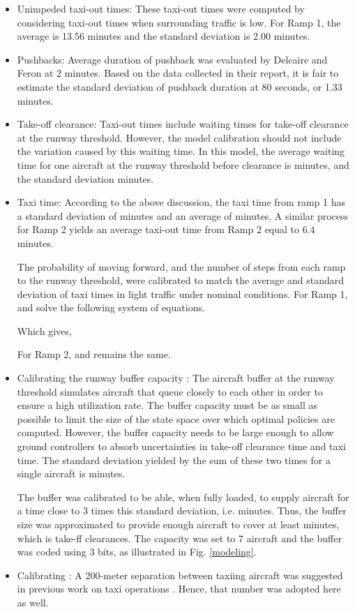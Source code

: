 \documentclass[letterpaper]{article}
\begin{document}
\fi
\begin{itemize}
\item Unimpeded taxi-out times: These taxi-out times were computed by considering taxi-out times when surrounding traffic is low. For Ramp 1, the average is 13.56 minutes and the standard deviation is 2.00 minutes.

\item Pushbacks:
Average duration of pushback was evaluated by Delcaire and Feron \cite{Delcaire1997} at 2 minutes. Based on the data collected in their report, it is fair to estimate the standard deviation of pushback duration at 80 seconds, or 1.33 minutes.

\item Take-off clearance:
Taxi-out times include waiting times for take-off clearance at the runway threshold. However, the 
model calibration should not include the variation caused by this waiting time. In this model, the average waiting time for one aircraft at the runway threshold before clearance is  minutes, and the standard deviation  minutes.

\item Taxi time:
According to the above discussion, the taxi time from ramp 1 has a standard deviation of  minutes 
and an average of  minutes. A similar process for Ramp 2 yields an average taxi-out time from Ramp 2 equal to 6.4 minutes.

The probability   of moving forward, and the number of steps  from each ramp to the runway threshold, were calibrated to match the average and standard deviation of taxi times in light traffic under nominal conditions. For Ramp 1,  and  solve the following system of equations.


 

Which gives,

 
For Ramp 2,  and  remains the same.
\item Calibrating the runway buffer capacity :
The aircraft buffer  at the runway threshold simulates aircraft that queue closely to each other in order to ensure a high utilization rate. 
The buffer capacity must be as small as possible to limit the size of the state space over which optimal policies are computed.
However, the buffer capacity needs to be large enough to allow ground controllers to absorb uncertainties in take-off clearance time and taxi time. 
The standard deviation yielded by the sum of these two times for a single aircraft is  minutes.

The buffer was calibrated to be able, when fully loaded, to supply aircraft for a time close to 3 times this standard deviation, i.e.  minutes. 
Thus,  the buffer size was approximated to provide enough aircraft to cover at least  minutes, which is  take-ff 
clearances. The capacity was set to 7 aircraft and the buffer was coded using 3 bits, as illustrated in Fig. \ref{modeling}.


\item Calibrating :
A 200-meter separation between taxiing aircraft was suggested in previous work on taxi operations \cite{Balakrishnan2007,Visser2003}. Hence, that number was adopted here as well.\\
\end{itemize}
\end{document}
